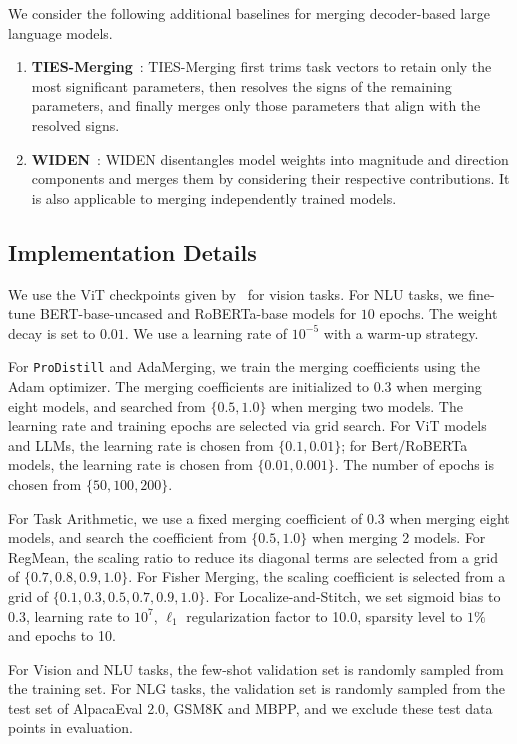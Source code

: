 We consider the following additional baselines for merging decoder-based large language models. 
\begin{enumerate}
    \item \textbf{TIES-Merging}~\citep{yadav2024ties}:  TIES-Merging first trims task vectors to retain only the most significant parameters, then resolves the signs of the remaining parameters, and finally merges only those parameters that align with the resolved signs.
    \item \textbf{WIDEN}~\citep{yu2024extend}: WIDEN disentangles model weights into magnitude and direction components and merges them by considering their respective contributions. It is also applicable to merging independently trained models.
\end{enumerate}

\subsection{Implementation Details}
\label{apx:impl}

We use the ViT checkpoints given by~\citep{ilharco2022editing} for vision tasks. 
For NLU tasks, we fine-tune BERT-base-uncased and RoBERTa-base models for $10$ epochs. The weight decay is set to $0.01$. We use a learning rate of $10^{-5}$ with a warm-up strategy.

For \texttt{ProDistill} and AdaMerging, we train the merging coefficients using the Adam optimizer. The merging coefficients are initialized to 0.3 when merging eight models, and searched from $\{0.5, 1.0\}$ when merging two models.
The learning rate and training epochs are selected via grid search.
For ViT models and LLMs, the learning rate is chosen from $\{0.1, 0.01\}$; for Bert/RoBERTa models, 
the learning rate is chosen from $\{0.01, 0.001\}$.
The number of epochs is chosen from $\{50, 100, 200\}$.  

For Task Arithmetic, we use a fixed merging coefficient of 0.3 when merging eight models, and search the coefficient from $\{0.5, 1.0\}$ when merging 2 models. For RegMean, the scaling ratio to reduce its diagonal terms are selected from a grid of $\{0.7, 0.8, 0.9, 1.0\}$. For Fisher Merging, the scaling coefficient is selected from a grid of $\{0.1, 0.3, 0.5, 0.7, 0.9, 1.0\}$.
For Localize-and-Stitch, we set sigmoid bias to 0.3, learning rate to $10^7$, $\ell_1$ regularization factor to 10.0, sparsity level to $1\%$ and epochs to 10.  

For Vision and NLU tasks, the few-shot validation set is randomly sampled from the training set. 
For NLG tasks, the validation set is randomly sampled from the test set of AlpacaEval 2.0, GSM8K and MBPP, and we exclude these test data points in evaluation. 